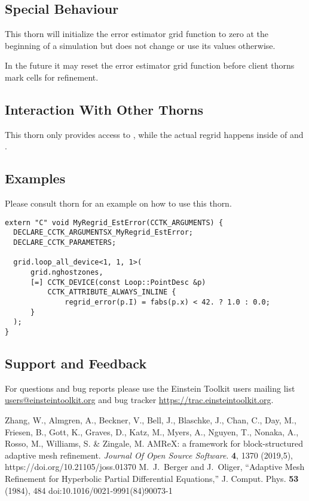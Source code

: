 \subsection{Special Behaviour}

This thorn will initialize the error estimator grid function
 to zero at the beginning of a simulation but does not
change or use its values otherwise.

In the future it may reset the error estimator grid function before client
thorns mark cells for refinement.

\subsection{Interaction With Other Thorns}

This thorn only provides access to , while the actual
regrid happens inside of  and . 

\subsection{Examples}

Please consult thorn  for an example on how to use this
thorn.

\begin{verbatim}
extern "C" void MyRegrid_EstError(CCTK_ARGUMENTS) {
  DECLARE_CCTK_ARGUMENTSX_MyRegrid_EstError;
  DECLARE_CCTK_PARAMETERS;

  grid.loop_all_device<1, 1, 1>(
      grid.nghostzones,
      [=] CCTK_DEVICE(const Loop::PointDesc &p)
          CCTK_ATTRIBUTE_ALWAYS_INLINE {
              regrid_error(p.I) = fabs(p.x) < 42. ? 1.0 : 0.0;
      }
  );
}
\end{verbatim}

\subsection{Support and Feedback}

For questions and bug reports please use the Einstein Toolkit users mailing
list \url{users@einsteintoolkit.org} and bug tracker
\url{https://trac.einsteintoolkit.org}.

\begin{thebibliography}{9}
 Zhang, W., Almgren, A., Beckner, V., Bell, J., Blaschke, J., Chan, C., Day, M., Friesen, B., Gott, K., Graves, D., Katz, M., Myers, A., Nguyen, T., Nonaka, A., Rosso, M., Williams, S. \& Zingale, M. AMReX: a framework for block-structured adaptive mesh refinement. {\em Journal Of Open Source Software}. \textbf{4}, 1370 (2019,5), https://doi.org/10.21105/joss.01370
 M.~J.~Berger and J.~Oliger, ``Adaptive Mesh Refinement for Hyperbolic Partial Differential Equations,'' J. Comput. Phys. \textbf{53} (1984), 484 doi:10.1016/0021-9991(84)90073-1
\end{thebibliography}



